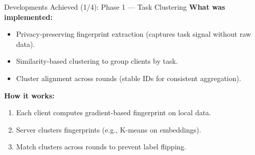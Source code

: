 \documentclass[aspectratio=169]{beamer}
\begin{document}
\begin{frame}{Developments Achieved (1/4): Phase 1 --- Task Clustering}
\textbf{What was implemented:}
\begin{itemize}
  \item Privacy-preserving fingerprint extraction (captures task signal without raw data).
  \item Similarity-based clustering to group clients by task.
  \item Cluster alignment across rounds (stable IDs for consistent aggregation).
\end{itemize}

\vspace{0.3cm}
\textbf{How it works:}
\begin{enumerate}
  \item Each client computes gradient-based fingerprint on local data.
  \item Server clusters fingerprints (e.g., K-means on embeddings).
  \item Match clusters across rounds to prevent label flipping.
\end{enumerate}

\end{frame}
\end{document}

